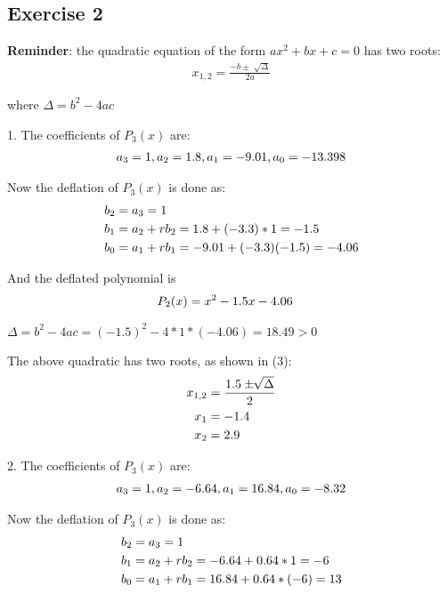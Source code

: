 \documentclass[12pt]{article}
\begin{document}
\subsection{Exercise 2}

\textbf{Reminder}: the quadratic equation of the form $ax^2 + bx +c = 0$ has two roots:
\begin{align}
x_{1,2} = \frac{-b \pm \sqrt[]{\Delta}}{2a}
\end{align}

where $\Delta = b^2 - 4ac$

1. The coefficients of $P_3(x)$ are:
\begin{align}
a_3 = 1, a_2 = 1.8, a_1 = -9.01, a_0 = -13.398 \notag
\end{align}

Now the deflation of $P_3(x)$ is done as:
\begin{align}
b_2 &= a_3 = 1 \notag \\
b_1 &= a_2 + rb_2 = 1.8 + (-3.3)*1 = -1.5 \notag \\
b_0 &= a_1 + rb_1 = -9.01 + (-3.3)(-1.5) = -4.06 \notag
\end{align}

And the deflated polynomial is
\begin{align}
P_2(x) &= x^2 - 1.5x - 4.06 \notag
\end{align}

$\Delta = b^2 - 4ac = (-1.5)^2-4*1*(-4.06) = 18.49 > 0 $

The above quadratic has two roots, as shown in (3):
\begin{align}
x_{1,2} &= \frac{1.5 \pm \sqrt[]{\Delta}}{2} \notag \\
x_1 &= -1.4 \notag \\
x_2 &= 2.9 \notag
\end{align}

2. The coefficients of $P_3(x)$ are:
\begin{align}
a_3 = 1, a_2 = -6.64, a_1 = 16.84, a_0 = -8.32 \notag
\end{align}


Now the deflation of $P_3(x)$ is done as:
\begin{align}
b_2 &= a_3 = 1 \notag \\
b_1 &= a_2 + rb_2 = -6.64 + 0.64*1 = -6 \notag \\
b_0 &= a_1 + rb_1 = 16.84 + 0.64*(-6) = 13 \notag
\end{align}
\end{document}
